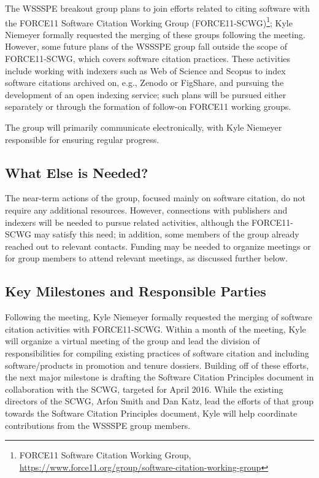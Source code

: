 The WSSSPE breakout group plans to join efforts related to citing software with the FORCE11 Software Citation Working Group (FORCE11-SCWG)\footnote{FORCE11 Software Citation Working Group, \url{https://www.force11.org/group/software-citation-working-group}}; Kyle Niemeyer formally requested the merging of these groups following the meeting.
However, some future plans of the WSSSPE group fall outside the scope of FORCE11-SCWG, which covers software citation practices.
These activities include working with indexers such as Web of Science and Scopus to index software citations archived on, e.g., Zenodo or FigShare, and pursuing the development of an open indexing service; such plans will be pursued either separately or through the formation of follow-on FORCE11 working groups.

The group will primarily communicate electronically, with Kyle Niemeyer responsible for ensuring regular progress.

\subsection{What Else is Needed?}

The near-term actions of the group, focused mainly on software citation, do not require any additional resources.
However, connections with publishers and indexers will be needed to pursue related activities, although the FORCE11-SCWG may satisfy this need; in addition, some members of the group already reached out to relevant contacts.
Funding may be needed to organize meetings or for group members to attend relevant meetings, as discussed further below.

\subsection{Key Milestones and Responsible Parties}

Following the meeting, Kyle Niemeyer formally requested the merging of software citation activities with FORCE11-SCWG.
Within a month of the meeting, Kyle will organize a virtual meeting of the group and lead the division of responsibilities for compiling existing practices of software citation and including software\slash products in promotion and tenure dossiers.
Building off of these efforts, the next major milestone is drafting the Software Citation Principles document in collaboration with the SCWG, targeted for April 2016.
While the existing directors of the SCWG, Arfon Smith and Dan Katz, lead the efforts of that group towards the Software Citation Principles document, Kyle will help coordinate contributions from the WSSSPE group members.


